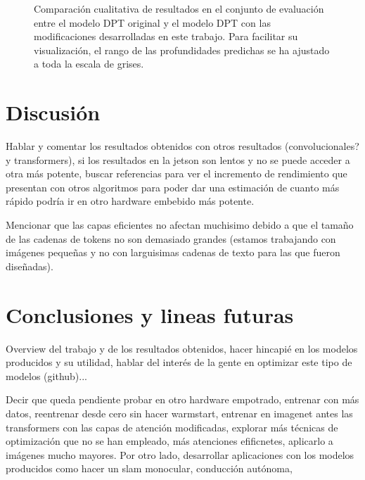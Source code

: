 \documentclass[a4paper, 11pt]{article}
\begin{document}
\begin{figure}[!ht]
\hfil
\hfil
    
\caption{Comparación cualitativa de resultados en el conjunto de evaluación entre el modelo DPT original y el modelo DPT con las modificaciones desarrolladas en este trabajo. Para facilitar su visualización, el rango de las profundidades predichas se ha ajustado a toda la escala de grises.}
    \label{fig:comparacion-cualitativa}
    \end{figure}
\captionsetup[subfigure]{labelformat=parens}






\clearpage
\section{Discusión}

Hablar y comentar los resultados obtenidos con otros resultados (convolucionales? y transformers), si los resultados en la jetson son lentos y no se puede acceder a otra más potente, buscar referencias para ver el incremento de rendimiento que presentan con otros algoritmos para poder dar una estimación de cuanto más rápido podría ir en otro hardware embebido más potente.

Mencionar que las capas eficientes no afectan muchisimo debido a que el tamaño de las cadenas de tokens no son demasiado grandes (estamos trabajando con imágenes pequeñas y no con larguisimas cadenas de texto para las que fueron diseñadas).

\clearpage
\section{Conclusiones y lineas futuras}
Overview del trabajo y de los resultados obtenidos, hacer hincapié en los modelos producidos y su utilidad, hablar del interés de la gente en optimizar este tipo de modelos (github)...


Decir que queda pendiente probar en otro hardware empotrado, entrenar con más datos, reentrenar desde cero sin hacer warmstart, entrenar en imagenet antes las transformers con las capas de atención modificadas, explorar más técnicas de optimización que no se han empleado, más atenciones efificnetes, aplicarlo a imágenes mucho mayores. Por otro lado, desarrollar aplicaciones con los modelos producidos como hacer un slam monocular, conducción autónoma, 
\end{document}
